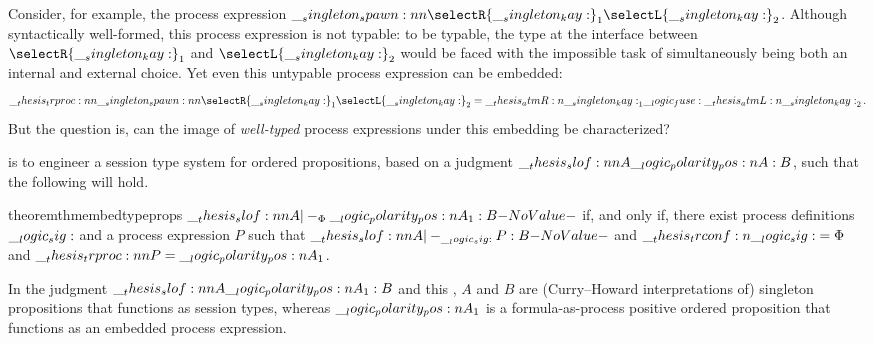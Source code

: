 Consider, for example, the process expression $\spawn{\selectR{\kay}_1}{\selectL{\kay}_2}$.
Although syntactically well-formed, this process expression is not typable: to be typable, the type at the interface between $\selectR{\kay}_1$ and $\selectL{\kay}_2$ would be faced with the impossible task of simultaneously being both an internal and external choice.
Yet even this untypable process expression can be embedded:
\begin{equation*}
  \trproc{\spawn{\selectR{\kay}_1}{\selectL{\kay}_2}}
    = \atmR{\kay}_1 \fuse \atmL{\kay}_2
  \,.
\end{equation*}
But the question is, can the image of \emph{well-typed} process expressions under this embedding be characterized?

 is to engineer a session type system for ordered propositions, based on a judgment $\slof{A |- \p{A} : B}$, such that the following  will hold.
%
\begin{restatable}[
  label=thm:embed:type-props
]{theorem}{thmembedtypeprops}
  $\slof{A |-_{\orsig} \p{A}_1 : B}$ if, and only if, there exist process definitions $\__logic_sig:$ and a process expression $P$ such that $\slof{A |-_{\sig} P : B}$ and $\__thesis_trconf:n {\__logic_sig:} = \Phi$ and $\trproc{P} = \p{A}_1$.
\end{restatable}
%
\noindent
In the judgment $\slof{A |- \p{A}_1 : B}$ and this , $A$ and $B$ are (Curry--Howard interpretations of) singleton propositions that functions as session types, whereas $\__logic_polarity_pos:n {A}_1$ is a formula-as-process positive ordered proposition that functions as an embedded process expression.

